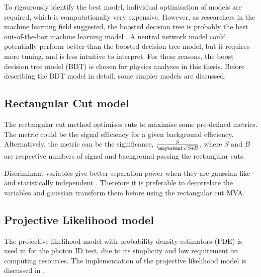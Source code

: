 To rigourously identify the best model, individual optimisation of models are required, which is computationally very expensive. However, as researchers in the machine learning field suggested, the boosted decision tree is probably the best out-of-the-box machine learning model  \cite{hastie2009elements}. A neutral network model could potentially perform better than the boosted decision tree model, but it requires more tuning, and is less intuitive to interpret. For these reasons, the boost decision tree model (BDT) is chosen for physics analyses in this thesis. Before describing the BDT model in detail, some simpler models are discussed.

\subsection{Rectangular Cut model}


The rectangular cut method optimises cuts to maximise some pre-defined metrics. The metric could be the signal efficiency for a given background efficiency. Alternatively, the metric can be the significance, $\frac{S}{\rootOf{S\!+\!B}}$, where $S$ and $B$ are respective numbers of  signal and background  passing the rectangular cuts.

Discriminant variables give better separation power when they are gaussian-like and statistically independent \cite{hastie2009elements}. Therefore it is preferable to decorrelate  the variables and gaussian transform them before using the rectangular cut MVA.


\subsection{Projective Likelihood model}
\label{sec:pandoraLikelihood}

The projective likelihood model with probability density estimators (PDE) is used in \pandora for the photon ID test,  due to its simplicity and low requirement on computing resources. The \pandora implementation of the projective likelihood model is discussed  in .

